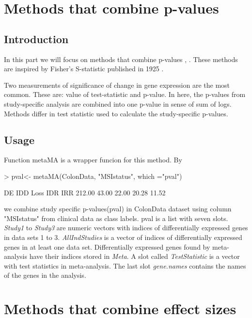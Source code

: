 \documentclass[a4paper]{report}
\begin{document}
\chapter{Methods that combine p-values}
\section*{Introduction}
In this part we will focus on methods that combine p-values \cite{Marot}, \cite{Rhodes}. These methods are inspired by Fisher's S-statistic published in 1925 \cite{Fisher25}. \par
Two measurements of significance of change in gene expression are the most common. These are: value of test-statistic and p-value. In here, the p-values from study-specific analysis are combined into one p-value in sense of sum of logs. Methods differ in test statistic used to calculate the study-specific p-values. 
\section*{Usage}
Function {\ttfamily metaMA} is a wrapper funcion for this method. By
\begin{Schunk}
\begin{Sinput}
> pval<- metaMA(ColonData, "MSIstatus", which ="pval")
\end{Sinput}
\begin{Soutput}
    DE    IDD   Loss    IDR    IRR 
212.00  43.00  22.00  20.28  11.52 
\end{Soutput}
\end{Schunk}
we combine study specific p-values({\ttfamily pval}) in {\ttfamily ColonData} dataset using column {\ttfamily "MSIstatus"} from clinical data as class labels. {\ttfamily pval} is a list with seven slots.   \emph{Study1} to \emph{Study3} are numeric vectors with indices of differentially expressed genes in data sets 1 to 3. \emph{AllIndStudies} is a vector of indices of differentially expressed genes in at least one data set. Differentially expressed genes found by meta-analysis have their indices stored in \emph{Meta}. A slot called \emph{TestStatistic} is a vector with test statistics in meta-analysis. The last slot \emph{gene.names} contains the names of the genes in the analysis.  


\chapter{Methods that combine effect sizes}
\end{document}
